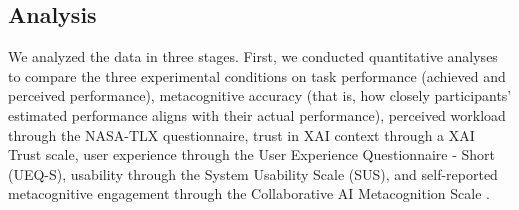 \documentclass[manuscript,review,anonymous]{acmart}
\begin{document}





\subsection{Analysis}
We analyzed the data in three stages. First, we conducted quantitative analyses to compare the three experimental conditions on task performance (achieved and perceived performance), metacognitive accuracy (that is, how closely participants' estimated performance aligns with their actual performance), perceived workload through the NASA-TLX questionnaire, trust in XAI context through a XAI Trust scale, user experience through the User Experience Questionnaire - Short (UEQ-S), usability through the System Usability Scale (SUS), and self-reported metacognitive engagement through the Collaborative AI Metacognition Scale \cite{Sidra03042026}.
\end{document}
